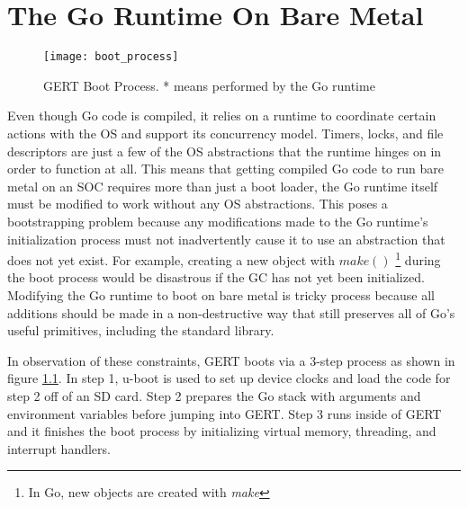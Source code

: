 \chapter{The Go Runtime On Bare Metal}

\begin{figure}[h]
\begin{center}
  \texttt{[image: boot\_process]}
\end{center}
  \caption{GERT Boot Process. * means performed by the Go runtime} \label{fig:boot}
\end{figure}

Even though Go code is compiled, it relies on a runtime to coordinate certain actions with the OS and support its concurrency model.
Timers, locks, and file descriptors are just a few of the OS abstractions that the runtime hinges on
in order to function at all. This means that getting compiled Go code to run bare metal on an SOC requires
more than just a boot loader, the Go runtime itself must be modified to work without any OS abstractions.
This poses a bootstrapping problem because any modifications made to the Go runtime's initialization
process must not inadvertently cause it to use an abstraction that does not yet exist. For example,
creating a new object with $make()$ \footnote{In Go, new objects are created with \textit{make}} during the boot process would be disastrous if the GC has not yet been initialized.
Modifying the Go runtime to boot on bare metal is tricky process because all additions should be made
in a non-destructive way that still preserves all of Go's useful primitives, including the standard library.


In observation of these constraints, GERT boots via a 3-step process as shown in figure \ref{fig:boot}.
In step 1, u-boot is used to set up device clocks and load the code for step 2 off of an SD card. Step 2 prepares the
Go stack with arguments and environment variables before jumping into GERT. Step 3 runs inside of GERT and it
finishes the boot process by initializing virtual memory, threading, and interrupt handlers.





